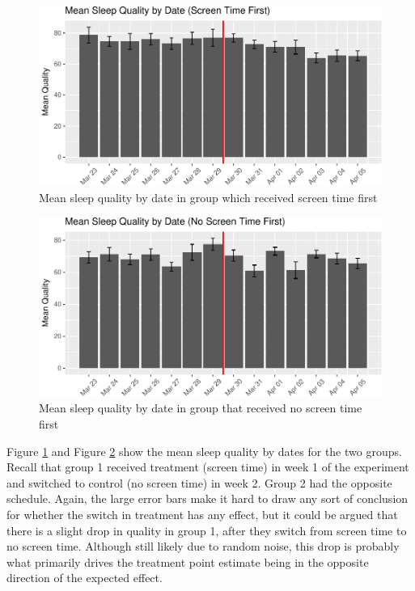 \documentclass[12pt,]{article}
\begin{document}
\begin{figure}
\centering
\includegraphics{report_files/figure-latex/quality_by_date_group1_fig-1.pdf}
\caption{\label{fig:quality_by_date_group1_fig} Mean sleep quality by
date in group which received screen time first}
\end{figure}

\begin{figure}
\centering
\includegraphics{report_files/figure-latex/quality_by_date_group2_fig-1.pdf}
\caption{\label{fig:quality_by_date_group2_fig} Mean sleep quality by
date in group that received no screen time first}
\end{figure}

Figure \ref{fig:quality_by_date_group1_fig} and Figure
\ref{fig:quality_by_date_group2_fig} show the mean sleep quality by
dates for the two groups. Recall that group 1 received treatment (screen
time) in week 1 of the experiment and switched to control (no screen
time) in week 2. Group 2 had the opposite schedule. Again, the large
error bars make it hard to draw any sort of conclusion for whether the
switch in treatment has any effect, but it could be argued that there is
a slight drop in quality in group 1, after they switch from screen time
to no screen time. Although still likely due to random noise, this drop
is probably what primarily drives the treatment point estimate being in
the opposite direction of the expected effect.
\end{document}
